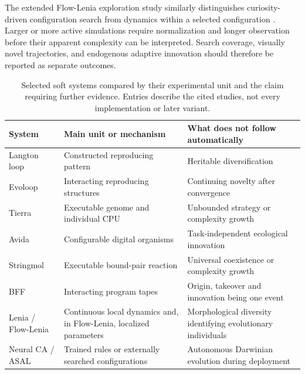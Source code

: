 The extended Flow-Lenia exploration study similarly distinguishes
curiosity-driven configuration search from dynamics within a selected
configuration \citep{Michel2026}. Larger or more active simulations require
normalization and longer observation before their apparent complexity can be
interpreted. Search coverage, visually novel trajectories, and endogenous
adaptive innovation should therefore be reported as separate outcomes.

\begin{table}[htbp]
\centering\small
\caption{Selected soft systems compared by their experimental unit and the
claim requiring further evidence. Entries describe the cited studies, not
every implementation or later variant.}
\begin{tabularx}{\textwidth}{@{}>{\raggedright\arraybackslash}p{25mm}YY@{}}
\toprule
System & Main unit or mechanism & What does not follow automatically \\
\midrule
Langton loop & Constructed reproducing pattern & Heritable diversification \\
Evoloop & Interacting reproducing structures & Continuing novelty after convergence \\
Tierra & Executable genome and individual CPU & Unbounded strategy or complexity growth \\
Avida & Configurable digital organisms & Task-independent ecological innovation \\
Stringmol & Executable bound-pair reaction & Universal coexistence or complexity growth \\
BFF & Interacting program tapes & Origin, takeover and innovation being one event \\
Lenia / Flow-Lenia & Continuous local dynamics and, in Flow-Lenia, localized parameters & Morphological diversity identifying evolutionary individuals \\
Neural CA / ASAL & Trained rules or externally searched configurations & Autonomous Darwinian evolution during deployment \\
\bottomrule
\end{tabularx}
\label{tab:soft}
\end{table}
